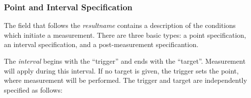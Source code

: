 \subsubsection{Point and Interval Specification}

The field that follows the {\it resultname} contains a description of
the conditions which initiate a measurement.  There are three basic
types:  a point specification, an interval specification, and a
post-measurement specificantion.

The {\it interval} begins with the ``trigger'' and ends with the
``target''.  Measurement will apply during this interval.  If no
target is given, the trigger sets the {\vt point}, where measurement
will be performed.  The trigger and target are independently specified
as follows:

